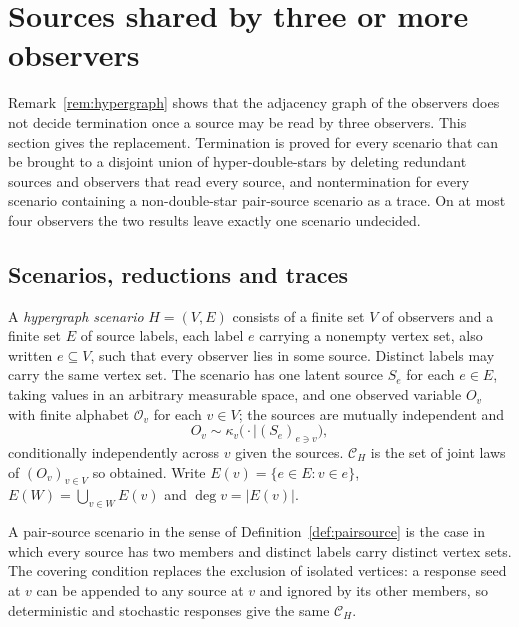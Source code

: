 \providecommand{\Cscen}[1]{\mathcal C_{#1}}
\providecommand{\supp}{\operatorname{supp}}

\section{Sources shared by three or more observers}\label{sec:hypergraph}

Remark~\ref{rem:hypergraph} shows that the adjacency graph of the observers does not decide termination once a source may be read by three observers. This section gives the replacement. Termination is proved for every scenario that can be brought to a disjoint union of hyper-double-stars by deleting redundant sources and observers that read every source, and nontermination for every scenario containing a non-double-star pair-source scenario as a trace. On at most four observers the two results leave exactly one scenario undecided.

\subsection{Scenarios, reductions and traces}

\begin{definition}\label{def:hscenario}
A \emph{hypergraph scenario} $H=(V,E)$ consists of a finite set $V$ of observers and a finite set $E$ of source labels, each label $e$ carrying a nonempty vertex set, also written $e\subseteq V$, such that every observer lies in some source. Distinct labels may carry the same vertex set. The scenario has one latent source $S_e$ for each $e\in E$, taking values in an arbitrary measurable space, and one observed variable $O_v$ with finite alphabet $\mathcal O_v$ for each $v\in V$; the sources are mutually independent and
\[
O_v\sim\kappa_v\bigl(\cdot\mid(S_e)_{e\ni v}\bigr),
\]
conditionally independently across $v$ given the sources. $\Cscen{H}$ is the set of joint laws of $(O_v)_{v\in V}$ so obtained. Write $E(v)=\{e\in E:v\in e\}$, $E(W)=\bigcup_{v\in W}E(v)$ and $\deg v=|E(v)|$.
\end{definition}

A pair-source scenario in the sense of Definition~\ref{def:pairsource} is the case in which every source has two members and distinct labels carry distinct vertex sets. The covering condition replaces the exclusion of isolated vertices: a response seed at $v$ can be appended to any source at $v$ and ignored by its other members, so deterministic and stochastic responses give the same $\Cscen{H}$.

